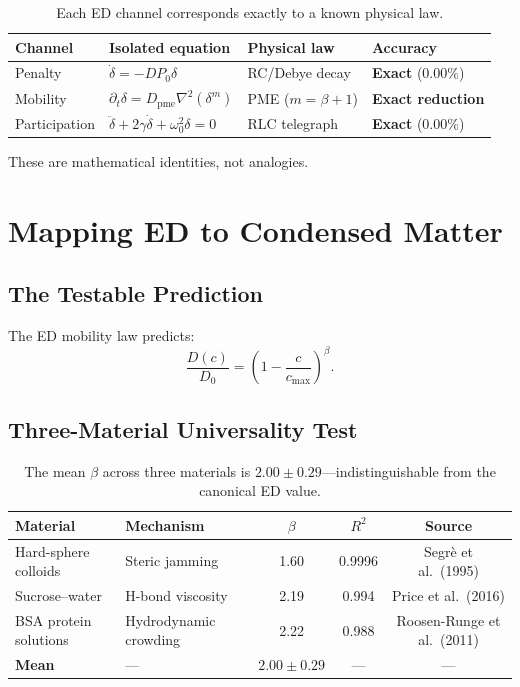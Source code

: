 \documentclass[12pt,letterpaper]{article}
\begin{document}
\begin{table}[H]
\centering
\begin{tabular}{@{}llll@{}}
\toprule
Channel & Isolated equation & Physical law & Accuracy \\
\midrule
Penalty & $\dot{\delta} = -DP_0\delta$ & RC/Debye decay & \textbf{Exact} (0.00\%) \\
Mobility & $\partial_t\delta = D_{\mathrm{pme}}\nabla^2(\delta^m)$ & PME ($m=\beta+1$) & \textbf{Exact reduction} \\
Participation & $\ddot{\delta}+2\gamma\dot{\delta}+\omega_0^2\delta=0$ & RLC telegraph & \textbf{Exact} (0.00\%) \\
\bottomrule
\end{tabular}
\caption{Each ED channel corresponds exactly to a known physical law.}
\end{table}

These are mathematical identities, not analogies.

\section{Mapping ED to Condensed Matter}

\subsection{The Testable Prediction}

The ED mobility law predicts:
\begin{equation}
\frac{D(c)}{D_0} = \left(1-\frac{c}{c_{\max}}\right)^\beta. \label{eq:mob_law}
\end{equation}

\subsection{Three-Material Universality Test}

\begin{table}[H]
\centering
\begin{tabular}{@{}llccc@{}}
\toprule
Material & Mechanism & $\beta$ & $R^2$ & Source \\
\midrule
Hard-sphere colloids & Steric jamming & 1.60 & 0.9996 & Segr\`e et al.\ (1995) \\
Sucrose--water & H-bond viscosity & 2.19 & 0.994 & Price et al.\ (2016) \\
BSA protein solutions & Hydrodynamic crowding & 2.22 & 0.988 & Roosen-Runge et al.\ (2011) \\
\midrule
\textbf{Mean} & --- & $\mathbf{2.00 \pm 0.29}$ & --- & --- \\
\bottomrule
\end{tabular}
\caption{The mean $\beta$ across three materials is $2.00 \pm 0.29$---indistinguishable from the canonical ED value.}
\end{table}
\end{document}
